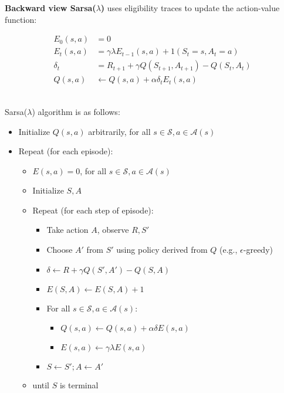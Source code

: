 \noindent \textbf{Backward view Sarsa($\lambda$)} uses eligibility traces to update the
action-value function:

\begin{align*}
    E_0(s, a) & = 0                                                  \\
    E_t(s, a) & = \gamma \lambda E_{t-1}(s, a) + 1(S_t = s, A_t = a) \\
    \delta_t  & = R_{t+1} + \gamma Q(S_{t+1}, A_{t+1}) - Q(S_t, A_t) \\
    Q(s, a)   & \leftarrow Q(s, a) + \alpha \delta_t E_t(s, a)
\end{align*}\

\noindent Sarsa($\lambda$) algorithm is as follows:

\begin{itemize}
    \item Initialize $Q(s, a)$ arbitrarily, for all $s \in \mathcal{S}, a \in
              \mathcal{A}(s)$
    \item Repeat (for each episode):
          \begin{itemize}
              \item $E(s, a) = 0$, for all $s \in \mathcal{S}, a \in \mathcal{A}(s)$
              \item Initialize $S, A$
              \item Repeat (for each step of episode):
                    \begin{itemize}
                        \item Take action $A$, observe $R, S'$
                        \item Choose $A'$ from $S'$ using policy derived from $Q$ (e.g., $\epsilon$-greedy)
                        \item $\delta \leftarrow R + \gamma Q(S', A') - Q(S, A)$
                        \item $E(S, A) \leftarrow E(S, A) + 1$
                        \item For all $s \in \mathcal{S}, a \in \mathcal{A}(s)$:
                              \begin{itemize}
                                  \item $Q(s, a) \leftarrow Q(s, a) + \alpha \delta E(s, a)$
                                  \item $E(s, a) \leftarrow \gamma \lambda E(s, a)$
                              \end{itemize}
                        \item $S \leftarrow S'; A \leftarrow A'$
                    \end{itemize}
              \item until $S$ is terminal
          \end{itemize}
\end{itemize}

